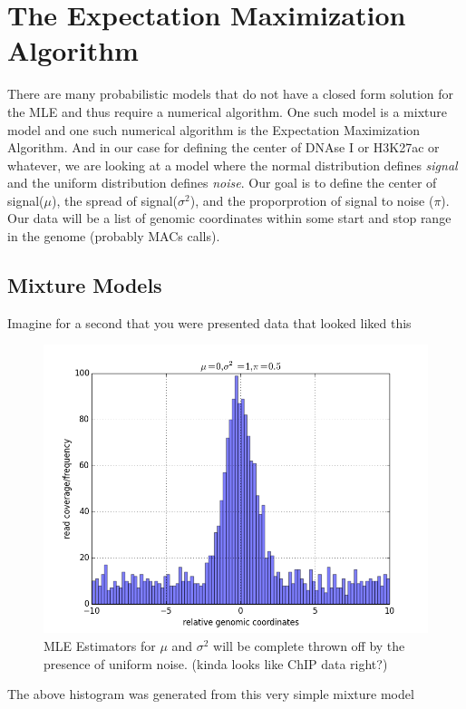 
\usepackage{textcomp}
\usepackage{amsfonts}
\usepackage{amssymb}
\usepackage{bbm}
\usepackage{amsmath,amssymb,amsthm,enumitem}
\newtheorem{theorem}{Theorem}[section]
\newcommand\numberthis{\addtocounter{equation}{1}\tag{\theequation}}
\theoremstyle{definition}
\usepackage{amsmath}
\usepackage[]{algorithm2e}
\usepackage[noend]{algpseudocode}
\makeatletter
\def\BState{\State\hskip-\ALG@thistlm}
\makeatother
\newtheorem{definition}{Definition}[section]
\newcommand{\Var}{\mathrm{Var}}
\newtheorem{corollary}{Corollary}[theorem]
\DeclareMathOperator*{\E}{\mathbb{E}}
\newcommand*{\Scale}[2][4]{\scalebox{#1}{$#2$}}



\section{The Expectation Maximization Algorithm}
There are many probabilistic models that do not have a closed form solution for the MLE and thus require a numerical algorithm. One such model is a mixture model and one such numerical algorithm is the Expectation Maximization Algorithm.  And in our case for defining the center of DNAse I or H3K27ac or whatever, we are looking at a model where the normal distribution defines \textit{signal} and the uniform distribution defines \textit{noise}. Our goal is to define the center of signal($\mu$), the spread of signal($\sigma^2$), and the proporprotion of signal to noise ($\pi$).  Our data will be a list of genomic coordinates within some start and stop range in the genome (probably MACs calls). 

\subsection{Mixture Models} 
Imagine for a second that you were presented data that looked liked this

\begin{figure}[!h]
\includegraphics[scale=0.5]{NU_EXAMPLE}
\caption{MLE Estimators for $\mu$ and $\sigma^2$ will be complete thrown off by the presence of uniform noise. (kinda looks like ChIP data right?)}
\end{figure}
The above histogram was generated from this very simple mixture model


